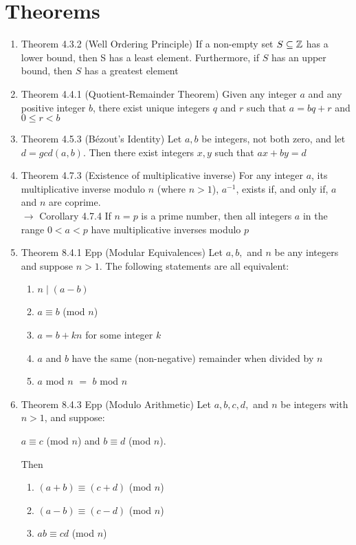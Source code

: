 \documentclass[a4paper]{article}
\begin{document}
\section{Theorems}
\begin{enumerate}
	\item[] Theorem 4.3.2 (Well Ordering Principle) If a non-empty set $S \subseteq \mathbb{Z}$ has a lower bound, then S has a least element. Furthermore, if $S$ has an upper bound, then $S$ has a greatest element
	\item[] Theorem 4.4.1 (Quotient-Remainder Theorem) Given any integer $a$ and any positive integer $b$, there exist unique integers $q$ and $r$ such that $a=bq+r$ and $0\le r < b$
	\item[] Theorem 4.5.3 (Bézout's Identity) Let $a, b$ be integers, not both zero, and let $d=gcd(a,b)$. Then there exist integers $x,y$ such that $ax+by=d$
	\item[] Theorem 4.7.3 (Existence of multiplicative inverse) For any integer $a$, its multiplicative inverse modulo $n$ (where $n>1$), $a^{-1}$, exists if, and only if, $a$ and $n$ are coprime.\\
	$\rightarrow$ Corollary 4.7.4 If $n=p$ is a prime number, then all integers $a$ in the range $0<a<p$ have multiplicative inverses modulo $p$
	\item[] Theorem 8.4.1 Epp (Modular Equivalences) Let $a, b,$ and $n$ be any integers and suppose $n>1$. The following statements are all equivalent:
	\begin{enumerate}
		\item $n\mid (a-b)$
		\item $a\equiv b$ (mod $n$)
		\item $a=b+kn$ for some integer $k$
		\item $a$ and $b$ have the same (non-negative) remainder when divided by $n$
		\item $a$ mod $n$ $=$ $b$ mod $n$
	\end{enumerate}
	\item[] Theorem 8.4.3 Epp (Modulo Arithmetic) Let $a, b, c, d,$ and $n$ be integers with $n>1$, and suppose:
	\begin{center}
		$a \equiv c$ (mod $n$) and $b \equiv d$ (mod $n$).
	\end{center}
	Then
	\begin{enumerate}
		\item $(a+b) \equiv (c+d)$ (mod $n$)
		\item $(a-b) \equiv (c-d)$ (mod $n$)
		\item $ab\equiv cd$ (mod $n$)

\end{enumerate}
\end{enumerate}
\end{document}
